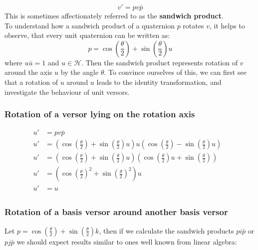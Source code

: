 \begin{equation}
    v' = pv\bar{p}
\end{equation}
This is sometimes affectionately referred to as the \textbf{sandwich product}.
\\
To understand how a sandwich product of a quaternion $p$ rotates $v$, it helps to observe, that every unit quaternion can be written as:
\begin{equation}
    p = \cos{(\frac{\theta}{2})} + \sin{(\frac{\theta}{2})}u
\end{equation}
where $u\bar{u} = 1$ and  $u\in \mathcal{H}$. Then the sandwich product represents rotation of $v$ around the axis $u$ by the angle $\theta$.
To convince ourselves of this, we can first see that a rotation of $u$ around $u$ leads to the identity transformation, and investigate the behaviour of unit versors.\\
\subsubsection{Rotation of a versor lying on the rotation axis}
\begin{equation}
    \begin{aligned}
        u'&=pv\bar{p}&\mbox{}\\[1.25ex]
        u'&=(\cos{(\frac{\theta}{2})}+\sin{(\frac{\theta}{2})u})u(\cos{(\frac{\theta}{2})}-\sin{(\frac{\theta}{2})u})&\mbox{}\\[1.25ex]
        u'&=(\cos{(\frac{\theta}{2})}+\sin{(\frac{\theta}{2})u})(\cos{(\frac{\theta}{2})}u+\sin{(\frac{\theta}{2})})&\mbox{}\\[1.25ex]
        u'&=(\cos{(\frac{\theta}{2})}^{2} + \sin{(\frac{\theta}{2})}^{2})u&\mbox{}\\[1.25ex]
        u'&=u&\mbox{}\\[1.25ex]
    \end{aligned}
\end{equation}
\subsubsection{Rotation of a basis versor around another basis versor}
Let $p = \cos{(\frac{\theta}{2})} + \sin{(\frac{\theta}{2})}k$, then if we calculate the sandwich products $pi\bar{p}$ or  $pj\bar{p}$ we should expect results similar to ones well known from linear algebra:\\

